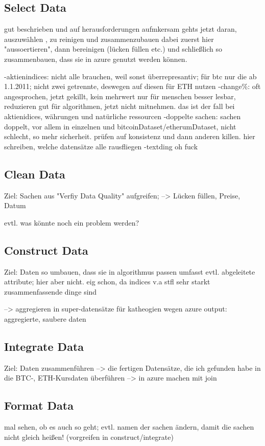 \subsection{Select Data}

gut beschrieben und auf herausforderungen aufmkersam gehts jetzt daran, auszuwählen , zu reinigen und zusammenzubauen
dabei zuerst hier "aussoertieren", dann bereinigen (lücken füllen etc.) und schließlich so zusammenbauen, dass sie in azure genutzt werden können. 

-aktienindices: nicht alle brauchen, weil sonst überrepresantiv; für btc nur die ab 1.1.2011; nicht zwei getrennte, deswegen auf diesen für ETH nutzen
-change\%: oft angesprochen, jetzt gekillt, kein mehrwert nur für menschen besser lesbar, reduzieren gut für algorithmen, jetzt nicht mitnehmen. das ist der fall bei aktienidices, währungen und natürliche ressourcen
-doppelte sachen: sachen doppelt, vor allem in einzelnen und bitcoinDataset/etherumDataset, nicht schlecht, so mehr sicherheit. prüfen auf konsistenz und dann anderen killen. hier schreiben, welche datensätze alle rausfliegen
-textding oh fuck




\subsection{Clean Data}
Ziel: Sachen aus "Verfiy Data Quality" aufgreifen;
--> Lücken füllen, Preise, Datum

evtl. was könnte noch ein problem werden?

\subsection{Construct Data}
Ziel: Daten so umbauen, dass sie in algorithmus passen
umfasst evtl. abgeleitete attribute; hier aber nicht. eig schon, da indices v.a stfl sehr starkt zusammenfassende dinge sind

--> aggregieren in super-datensätze für katheogien wegen azure
output: aggregierte, saubere daten


\subsection{Integrate Data}
Ziel: Daten zusammenführen
--> die fertigen Datensätze, die ich gefunden habe in die BTC-, ETH-Kursdaten überführen
--> in azure machen mit join

\subsection{Format Data}
mal sehen, ob es auch so geht; evtl. namen der sachen ändern, damit die sachen nicht gleich heißen! (vorgreifen in construct/integrate)







